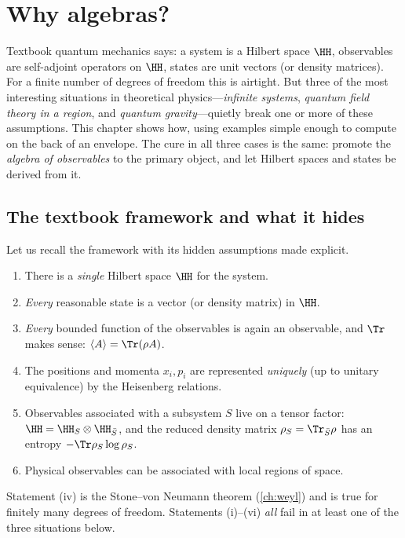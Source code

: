 \chapter{Why algebras?}\label{ch:why_algebras}

\begin{physmotiv}
Textbook quantum mechanics says: a system is a Hilbert space $\HH$, observables are self-adjoint operators on $\HH$, states are unit vectors (or density matrices). For a finite number of degrees of freedom this is airtight. But three of the most interesting situations in theoretical physics---\emph{infinite systems}, \emph{quantum field theory in a region}, and \emph{quantum gravity}---quietly break one or more of these assumptions. This chapter shows how, using examples simple enough to compute on the back of an envelope. The cure in all three cases is the same: promote the \emph{algebra of observables} to the primary object, and let Hilbert spaces and states be derived from it.
\end{physmotiv}

\section{The textbook framework and what it hides}

Let us recall the framework with its hidden assumptions made explicit.

\begin{enumerate}[label=(\roman*)]
\item There is a \emph{single} Hilbert space $\HH$ for the system.
\item \emph{Every} reasonable state is a vector (or density matrix) in $\HH$.
\item \emph{Every} bounded function of the observables is again an observable, and $\Tr$ makes sense: $\langle A\rangle=\Tr(\rho A)$.
\item The positions and momenta $x_i,p_i$ are represented \emph{uniquely} (up to unitary equivalence) by the Heisenberg relations.
\item Observables associated with a subsystem $S$ live on a tensor factor: $\HH=\HH_S\otimes\HH_{\bar S}$, and the reduced density matrix $\rho_S=\Tr_{\bar S}\rho$ has an entropy $-\Tr\rho_S\log\rho_S$.
\item Physical observables can be associated with local regions of space.
\end{enumerate}

Statement (iv) is the Stone--von Neumann theorem (\cref{ch:weyl}) and is true for finitely many degrees of freedom. Statements (i)--(vi) \emph{all} fail in at least one of the three situations below.

